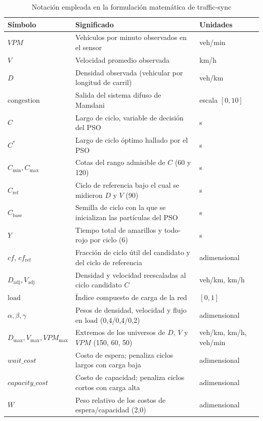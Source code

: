 \begin{table}[htbp]
\renewcommand{\arraystretch}{1.2}
\caption{Notación empleada en la formulación matemática de traffic-sync}
\label{tab:sync_notacion}
\centering
\footnotesize
\begin{tabular}{lll}
\hline
\textbf{Símbolo} & \textbf{Significado} & \textbf{Unidades} \\
\hline
$VPM$ & Vehículos por minuto observados en el sensor & veh/min \\
$V$ & Velocidad promedio observada & km/h \\
$D$ & Densidad observada (vehicular por longitud de carril) & veh/km \\
$\text{congestion}$ & Salida del sistema difuso de Mamdani & escala $[0,10]$ \\
$C$ & Largo de ciclo, variable de decisión del PSO & s \\
$C^{*}$ & Largo de ciclo óptimo hallado por el PSO & s \\
$C_{\min}, C_{\max}$ & Cotas del rango admisible de $C$ (60 y 120) & s \\
$C_{\text{ref}}$ & Ciclo de referencia bajo el cual se midieron $D$ y $V$ (90) & s \\
$C_{\text{base}}$ & Semilla de ciclo con la que se inicializan las partículas del PSO & s \\
$Y$ & Tiempo total de amarillos y todo-rojo por ciclo (6) & s \\
$cf$, $cf_{\text{ref}}$ & Fracción de ciclo útil del candidato y del ciclo de referencia & adimensional \\
$D_{\text{adj}}, V_{\text{adj}}$ & Densidad y velocidad reescaladas al ciclo candidato $C$ & veh/km, km/h \\
$\text{load}$ & Índice compuesto de carga de la red & $[0,1]$ \\
$\alpha, \beta, \gamma$ & Pesos de densidad, velocidad y flujo en $\text{load}$ (0,4/0,4/0,2) & adimensional \\
$D_{\max}, V_{\max}, VPM_{\max}$ & Extremos de los universos de $D$, $V$ y $VPM$ (150, 60, 50) & veh/km, km/h, veh/min \\
$\mathit{wait\_cost}$ & Costo de espera; penaliza ciclos largos con carga baja & adimensional \\
$\mathit{capacity\_cost}$ & Costo de capacidad; penaliza ciclos cortos con carga alta & adimensional \\
$W$ & Peso relativo de los costos de espera/capacidad (2,0) & adimensional \\

\end{tabular}
\end{table}
